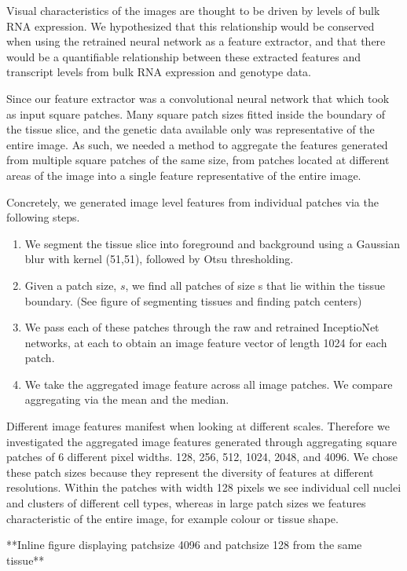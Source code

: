 \documentclass[graybox]{svmult}
\begin{document}
Visual characteristics of the images are thought to be driven by levels of bulk RNA expression. We hypothesized that this relationship would be conserved when using the retrained neural network as a feature extractor, and that there would be a quantifiable relationship between these extracted features and transcript levels from bulk RNA expression and genotype data.  

Since our feature extractor was a convolutional neural network that which took as input square patches. Many square patch sizes fitted inside the boundary of the tissue slice, and the genetic data available only was representative of the entire image. As such, we needed a method to aggregate the features generated from multiple square patches of the same size, from patches located at different areas of the image into a single feature representative of the entire image. 

Concretely, we generated image level features from individual patches via the following steps.

\begin{enumerate}
 \item We segment the tissue slice into foreground and background using a Gaussian blur with kernel (51,51), followed by Otsu thresholding.
 \item Given a patch size, $s$, we find all patches of size s that lie within the tissue boundary. (See figure of segmenting tissues and finding patch centers)
 \item We pass each of these patches through the raw and retrained InceptioNet networks, at each to obtain an image feature vector of length 1024 for each patch.
 \item We take the aggregated image feature across all image patches. We compare aggregating via the mean and the median.
\end{enumerate}

Different image features manifest when looking at different scales. Therefore we investigated the aggregated image features generated through aggregating square patches of 6 different pixel widths. 128, 256, 512, 1024, 2048, and 4096. We chose these patch sizes because they represent the diversity of features at different resolutions. Within the patches with width 128 pixels we see individual cell nuclei and clusters of different cell types, whereas in large patch sizes we features characteristic of the entire image, for example colour or tissue shape. 

**Inline figure displaying patchsize 4096 and patchsize 128 from the same tissue**
\end{document}
